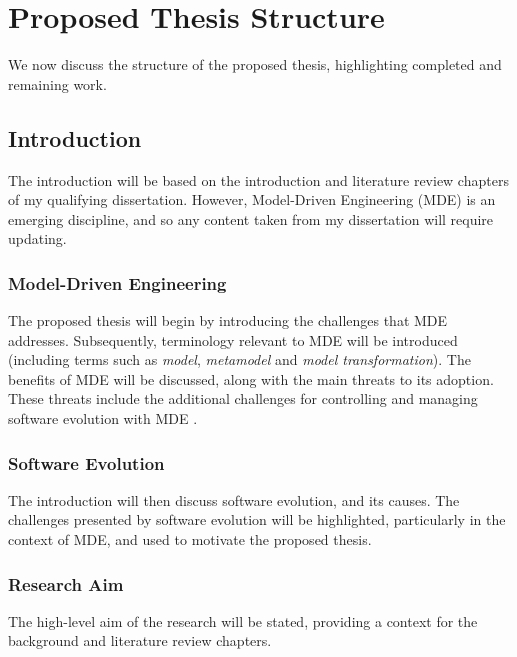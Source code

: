 

\section{Proposed Thesis Structure}
We now discuss the structure of the proposed thesis, highlighting completed and remaining work.


\subsection{Introduction}
The introduction will be based on the introduction and literature review chapters of my qualifying dissertation. However, Model-Driven Engineering (MDE) is an emerging discipline, and so any content taken from my dissertation will require updating.

\subsubsection{Model-Driven Engineering}
The proposed thesis will begin by introducing the challenges that MDE addresses. Subsequently, terminology relevant to MDE will be introduced (including terms such as \emph{model}, \emph{metamodel} and \emph{model transformation}). The benefits of MDE will be discussed, along with the main threats to its adoption. These threats include the additional challenges for controlling and managing software evolution with MDE \cite{Mens07}.

\subsubsection{Software Evolution}
The introduction will then discuss software evolution, and its causes. The challenges presented by software evolution will be highlighted, particularly in the context of MDE, and used to motivate the proposed thesis.

\subsubsection{Research Aim}
The high-level aim of the research will be stated, providing a context for the background and literature review chapters. 


